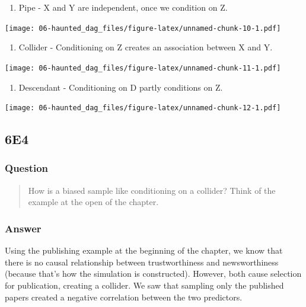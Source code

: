 \documentclass[
]{book}
\providecommand{\tightlist}{%
  \setlength{\itemsep}{0pt}\setlength{\parskip}{0pt}}
\begin{document}
\begin{enumerate}
\def\labelenumi{\arabic{enumi}.}
\setcounter{enumi}{1}
\tightlist
\item
  Pipe - X and Y are independent, once we condition on Z.
\end{enumerate}

\texttt{[image: 06-haunted\_dag\_files/figure-latex/unnamed-chunk-10-1.pdf]}

\begin{enumerate}
\def\labelenumi{\arabic{enumi}.}
\setcounter{enumi}{2}
\tightlist
\item
  Collider - Conditioning on Z creates an association between X and Y.
\end{enumerate}

\texttt{[image: 06-haunted\_dag\_files/figure-latex/unnamed-chunk-11-1.pdf]}

\begin{enumerate}
\def\labelenumi{\arabic{enumi}.}
\setcounter{enumi}{3}
\tightlist
\item
  Descendant - Conditioning on D partly conditions on Z.
\end{enumerate}

\texttt{[image: 06-haunted\_dag\_files/figure-latex/unnamed-chunk-12-1.pdf]}

\hypertarget{e4-4}{%
\subsection*{6E4}\label{e4-4}}

\hypertarget{question-51}{%
\subsubsection*{Question}\label{question-51}}

\begin{quote}
How is a biased sample like conditioning on a collider? Think of the example at the open of the chapter.
\end{quote}

\hypertarget{answer-51}{%
\subsubsection*{Answer}\label{answer-51}}

Using the publishing example at the beginning of the chapter, we know that there is no causal relationship between trustworthiness and newsworthiness (because that's how the simulation is constructed). However, both cause selection for publication, creating a collider. We saw that sampling only the published papers created a negative correlation between the two predictors.
\end{document}
